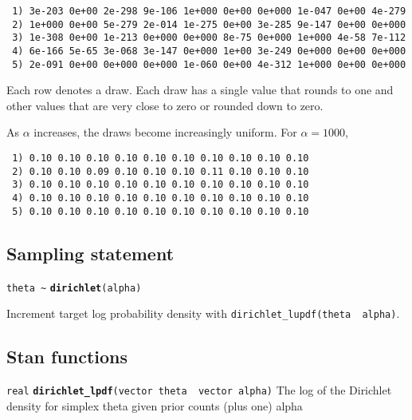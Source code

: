\documentclass[
  10pt,
]{book}
\begin{document}
\begin{verbatim}
 1) 3e-203 0e+00 2e-298 9e-106 1e+000 0e+00 0e+000 1e-047 0e+00 4e-279
 2) 1e+000 0e+00 5e-279 2e-014 1e-275 0e+00 3e-285 9e-147 0e+00 0e+000
 3) 1e-308 0e+00 1e-213 0e+000 0e+000 8e-75 0e+000 1e+000 4e-58 7e-112
 4) 6e-166 5e-65 3e-068 3e-147 0e+000 1e+00 3e-249 0e+000 0e+00 0e+000
 5) 2e-091 0e+00 0e+000 0e+000 1e-060 0e+00 4e-312 1e+000 0e+00 0e+000
\end{verbatim}

Each row denotes a draw. Each draw has a single value that rounds to
one and other values that are very close to zero or rounded down to
zero.

As \(\alpha\) increases, the draws become increasingly uniform. For
\(\alpha = 1000\),

\begin{verbatim}
 1) 0.10 0.10 0.10 0.10 0.10 0.10 0.10 0.10 0.10 0.10
 2) 0.10 0.10 0.09 0.10 0.10 0.10 0.11 0.10 0.10 0.10
 3) 0.10 0.10 0.10 0.10 0.10 0.10 0.10 0.10 0.10 0.10
 4) 0.10 0.10 0.10 0.10 0.10 0.10 0.10 0.10 0.10 0.10
 5) 0.10 0.10 0.10 0.10 0.10 0.10 0.10 0.10 0.10 0.10
\end{verbatim}

\hypertarget{sampling-statement-56}{%
\subsection{Sampling statement}\label{sampling-statement-56}}

\texttt{theta\ \textasciitilde{}} \textbf{\texttt{dirichlet}}\texttt{(alpha)}

Increment target log probability density with \texttt{dirichlet\_lupdf(theta\ \textbar{}\ alpha)}.

\hypertarget{stan-functions-55}{%
\subsection{Stan functions}\label{stan-functions-55}}


\texttt{real} \textbf{\texttt{dirichlet\_lpdf}}\texttt{(vector\ theta\ \textbar{}\ vector\ alpha)}\newline
The log of the Dirichlet density for simplex theta given prior counts
(plus one) alpha

\end{document}
